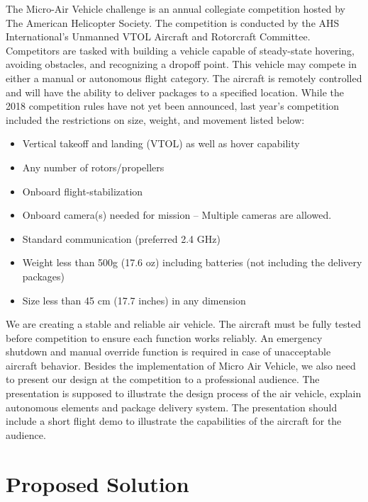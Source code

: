 \documentclass[onecolumn, draftclsnofoot,10pt, compsoc]{IEEEtran}
\begin{document}
The Micro-Air Vehicle challenge is an annual collegiate competition hosted by The American Helicopter Society. The competition is conducted by the AHS International’s Unmanned VTOL Aircraft and Rotorcraft Committee. Competitors are tasked with building a vehicle capable of steady-state hovering, avoiding obstacles, and recognizing a dropoff point. This vehicle may compete in either a manual or autonomous flight category. The aircraft is remotely controlled and will have the ability to deliver packages to a specified location. While the 2018 competition rules have not yet been announced, last year’s competition included the restrictions on size, weight, and movement listed below:
\begin{itemize}
\item Vertical takeoff and landing (VTOL) as well as hover capability
\item Any number of rotors/propellers
\item Onboard flight-stabilization
\item Onboard camera(s) needed for mission – Multiple cameras are allowed.
\item Standard communication (preferred 2.4 GHz)
\item Weight less than 500g (17.6 oz) including batteries (not including the delivery packages)
\item Size less than 45 cm (17.7 inches) in any dimension
\end{itemize}

We are creating a stable and reliable air vehicle. The aircraft must be fully tested before competition to ensure each function works reliably. An emergency shutdown and manual override function is required in case of unacceptable aircraft behavior. Besides the implementation of Micro Air Vehicle, we also need to present our design at the competition to a professional audience. The presentation is supposed to illustrate the design process of the air vehicle, explain autonomous elements and package delivery system. The presentation should include a short flight demo to illustrate the capabilities of the aircraft for the audience.



\section{Proposed Solution}
\end{document}
